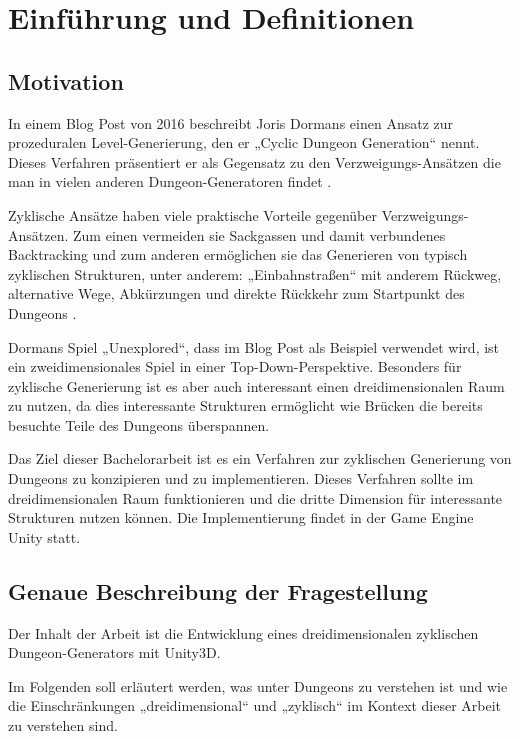 \chapter{Einführung und Definitionen}

\section{Motivation}

In einem Blog Post von 2016 beschreibt Joris Dormans einen Ansatz zur prozeduralen Level-Generierung, den er „Cyclic Dungeon Generation“ nennt. Dieses Verfahren präsentiert er als Gegensatz zu den Verzweigungs-Ansätzen die man in vielen anderen Dungeon-Generatoren findet \cite{blogCyclic}.

Zyklische Ansätze haben viele praktische Vorteile gegenüber Verzweigungs-Ansätzen. Zum einen vermeiden sie Sackgassen und damit verbundenes Backtracking und zum anderen ermöglichen sie das Generieren von typisch zyklischen Strukturen, unter anderem: „Einbahnstraßen“ mit anderem Rückweg, alternative Wege, Abkürzungen und direkte Rückkehr zum Startpunkt des Dungeons 
\cite{blogCyclic}.

Dormans Spiel „Unexplored“, dass im Blog Post als Beispiel verwendet wird, ist ein zweidimensionales Spiel in einer Top-Down-Perspektive. Besonders für zyklische Generierung ist es aber auch interessant einen dreidimensionalen Raum zu nutzen, da dies interessante Strukturen ermöglicht wie Brücken die bereits besuchte Teile des Dungeons überspannen.  

Das Ziel dieser Bachelorarbeit ist es ein Verfahren zur zyklischen Generierung von Dungeons zu konzipieren und zu implementieren. Dieses Verfahren sollte im dreidimensionalen Raum funktionieren und die dritte Dimension für interessante Strukturen nutzen können. Die Implementierung findet in der Game Engine Unity statt.



\section{Genaue Beschreibung der Fragestellung}

Der Inhalt der Arbeit ist die Entwicklung eines dreidimensionalen zyklischen Dungeon-Generators mit Unity3D. 

Im Folgenden soll erläutert werden, was unter Dungeons zu verstehen ist und wie die Einschränkungen „dreidimensional“ und „zyklisch“ im Kontext dieser Arbeit zu verstehen sind.

